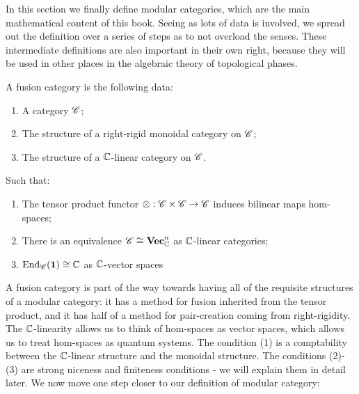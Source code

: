 In this section we finally define modular categories, which are the main mathematical content of this book. Seeing as lots of data is involved, we spread out the definition over a series of steps as to not overload the senses. These intermediate definitions are also important in their own right, because they will be used in other places in the algebraic theory of topological phases.


\begin{definition} A fusion category is the following data:

\begin{enumerate}
\item A category $\mathscr{C}$;
\item The structure of a right-rigid monoidal category on $\mathscr{C}$;
\item The structure of a $\mathbb{C}$-linear category on $\mathscr{C}$.
\end{enumerate}

Such that:

\begin{enumerate}
\item The tensor product functor $\otimes: \mathscr{C}\times \mathscr{C}\to \mathscr{C}$ induces bilinear maps hom-spaces;
\item There is an equivalence $\mathscr{C} \cong \mathbf{Vec}_{\mathbb{C}}^n$ as $\mathbb{C}$-linear categories;
\item $\operatorname{End}_{\mathscr{C}}(\mathbf{1})\cong \mathbb{C}$ as $\mathbb{C}$-vector spaces
\end{enumerate}

\raggedleft\qedsymbol{}
\end{definition}

A fusion category is part of the way towards having all of the requisite structures of a modular category: it has a method for fusion inherited from the tensor product, and it has half of a method for pair-creation coming from right-rigidity. The $\mathbb{C}$-linearity allows us to think of hom-spaces as vector spaces, which allows us to treat hom-spaces as quantum systems. The condition (1) is a comptability between the $\mathbb{C}$-linear structure and the monoidal structure. The conditions (2)-(3) are strong niceness and finiteness conditions - we will explain them in detail later. We now move one step closer to our definition of modular category:

